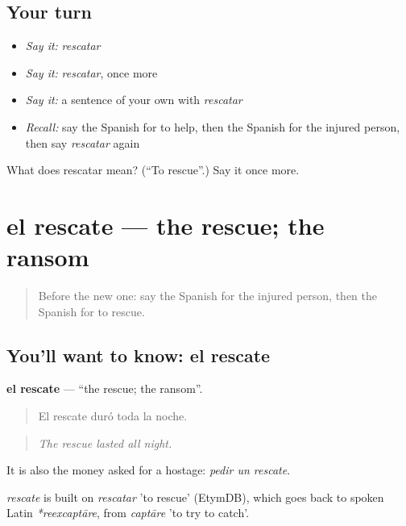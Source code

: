 \subsection*{Your turn}
\begin{itemize}
\raggedright
  \item \emph{Say it:} \emph{rescatar}
  \item \emph{Say it:} \emph{rescatar}, once more
  \item \emph{Say it:} a sentence of your own with \emph{rescatar}
  \item \emph{Recall:} say the Spanish for to help, then the Spanish for the injured person, then say \emph{rescatar} again
\end{itemize}

\begin{tcolorbox}[breakable,colback=teal!4,colframe=teal!35!black,title={Before you move on}]
What does rescatar mean? (\textquotedblleft{}To rescue\textquotedblright{}.) Say it once more.
\end{tcolorbox}
\section[el rescate]{el rescate — the rescue; the ransom}

\label{lesson:ES-C526-rescate}



\begin{quote}
Before the new one: say the Spanish for the injured person, then the Spanish for to rescue.
\end{quote}

\subsection*{You'll want to know: el rescate}
\textbf{el rescate} — \textquotedblleft{}the rescue; the ransom\textquotedblright{}.

\begin{quote}
El rescate duró toda la noche.
\end{quote}

\begin{quote}
\emph{The rescue lasted all night.}
\end{quote}

It is also the money asked for a hostage: \emph{pedir un rescate}.

\begin{cousinweb}
\emph{rescate} is built on \emph{rescatar} 'to rescue' (EtymDB), which goes back to spoken Latin \emph{*reexcaptāre}, from \emph{captāre} 'to try to catch'.
\end{cousinweb}

